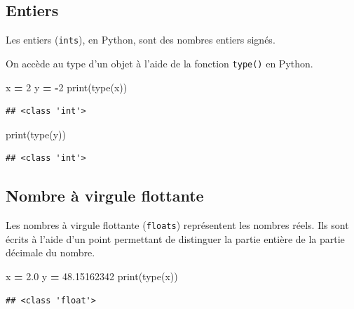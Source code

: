 \documentclass[12pt,]{book}
\newenvironment{Shaded}{\begin{snugshade}}{\end{snugshade}}
\newcommand{\DecValTok}[1]{\textcolor[rgb]{0.00,0.00,0.81}{#1}}
\newcommand{\FloatTok}[1]{\textcolor[rgb]{0.00,0.00,0.81}{#1}}
\newcommand{\OperatorTok}[1]{\textcolor[rgb]{0.81,0.36,0.00}{\textbf{#1}}}
\newcommand{\BuiltInTok}[1]{#1}
\newcommand{\NormalTok}[1]{#1}
\numberwithin{equation}{section}
\numberwithin{countremarque}{section}
\let\BeginKnitrBlock\begin \let\EndKnitrBlock\end
\begin{document}
\subsection{Entiers}\label{entiers}

Les entiers (\texttt{ints}), en Python, sont des nombres entiers signés.

\BeginKnitrBlock{remarque}
On accède au type d'un objet à l'aide de la fonction \texttt{type()} en
Python.
\EndKnitrBlock{remarque}

\begin{Shaded}
\begin{Highlighting}[]
\NormalTok{x }\OperatorTok{=} \DecValTok{2}
\NormalTok{y }\OperatorTok{=} \OperatorTok{-}\DecValTok{2}
\BuiltInTok{print}\NormalTok{(}\BuiltInTok{type}\NormalTok{(x))}
\end{Highlighting}
\end{Shaded}

\begin{lstlisting}
## <class 'int'>
\end{lstlisting}

\begin{Shaded}
\begin{Highlighting}[]
\BuiltInTok{print}\NormalTok{(}\BuiltInTok{type}\NormalTok{(y))}
\end{Highlighting}
\end{Shaded}

\begin{lstlisting}
## <class 'int'>
\end{lstlisting}

\subsection{Nombre à virgule
flottante}\label{nombre-a-virgule-flottante}

Les nombres à virgule flottante (\texttt{floats}) représentent les
nombres réels. Ils sont écrits à l'aide d'un point permettant de
distinguer la partie entière de la partie décimale du nombre.

\begin{Shaded}
\begin{Highlighting}[]
\NormalTok{x }\OperatorTok{=} \FloatTok{2.0}
\NormalTok{y }\OperatorTok{=} \FloatTok{48.15162342}
\BuiltInTok{print}\NormalTok{(}\BuiltInTok{type}\NormalTok{(x))}
\end{Highlighting}
\end{Shaded}

\begin{lstlisting}
## <class 'float'>
\end{lstlisting}
\end{document}
